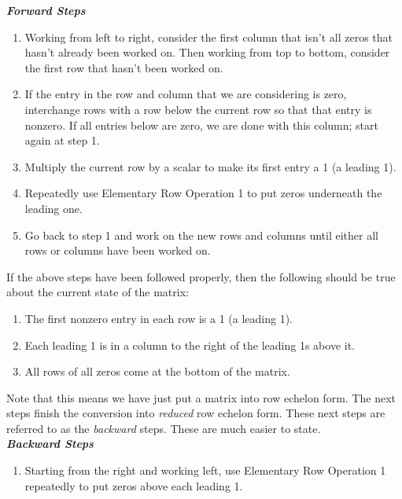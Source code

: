 \textbf{\em Forward Steps}
\begin{enumerate}
\item		Working from left to right, consider the first column that isn't all zeros that hasn't already been worked on. Then working from top to bottom, consider the first row that hasn't been worked on.
\item		If the entry in the row and column that we are considering is zero, interchange rows with a row below the current row so that that entry is nonzero. If all entries below are zero, we are done with this column; start again at step 1. 
\item		Multiply the current row by a scalar to make its first entry a 1 (a leading 1).
\item		Repeatedly use Elementary Row Operation 1 to put zeros underneath the leading one.
\item		Go back to step 1 and work on the new rows and columns until either all rows or columns have been worked on.
\end{enumerate}

If the above steps have been followed properly, then the following should be true about the current state of the matrix:

\begin{enumerate}
\item		The first nonzero entry in each row is a 1 (a leading 1).
\item		Each leading 1 is in a column to the right of the leading 1s above it.
\item		All rows of all zeros come at the bottom of the matrix.
\end{enumerate}

Note that this means we have just put a matrix into row echelon form. The next steps finish the conversion into \textit{reduced} row echelon form. These next steps are referred to as the \textit{backward} steps. These are much easier to state.\\

\textbf{\em Backward Steps}
\begin{enumerate}
\item		Starting from the right and working left, use Elementary Row Operation 1 repeatedly to put zeros above each leading 1.
\end{enumerate}

